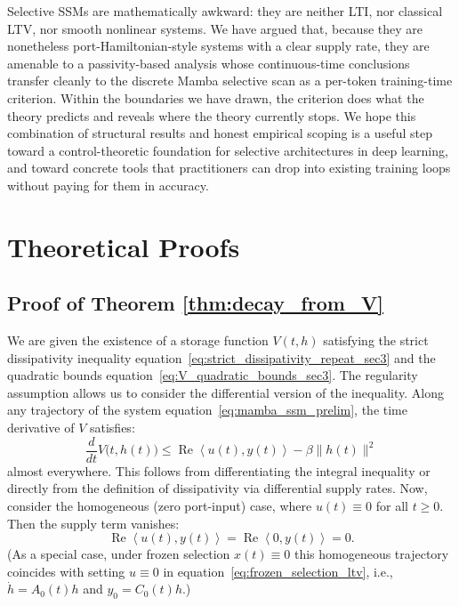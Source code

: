 \documentclass[10pt]{article} %
\def\eqref#1{equation~\ref{#1}}
\newcommand{\ip}[2]{\left\langle #1, #2 \right\rangle} %
\DeclareMathOperator{\realPart}{Re}                     %
\theoremstyle{definition}
\begin{document}
Selective SSMs are mathematically awkward: they are neither LTI, nor classical LTV, nor smooth nonlinear systems. We have argued that, because they are nonetheless port-Hamiltonian-style systems with a clear supply rate, they are amenable to a passivity-based analysis whose continuous-time conclusions transfer cleanly to the discrete Mamba selective scan as a per-token training-time criterion. Within the boundaries we have drawn, the criterion does what the theory predicts and reveals where the theory currently stops. We hope this combination of structural results and honest empirical scoping is a useful step toward a control-theoretic foundation for selective architectures in deep learning, and toward concrete tools that practitioners can drop into existing training loops without paying for them in accuracy.

\newpage




\newpage

\appendix
\section{Theoretical Proofs}
\label{appendix}

\subsection{Proof of Theorem \ref{thm:decay_from_V}}
\label{subsec:exp_decay_from_str_pass}
We are given the existence of a storage function $V(t,h)$ satisfying the strict dissipativity inequality \eqref{eq:strict_dissipativity_repeat_sec3} and the quadratic bounds \eqref{eq:V_quadratic_bounds_sec3}. The regularity assumption allows us to consider the differential version of the inequality. Along any trajectory of the system \eqref{eq:mamba_ssm_prelim}, the time derivative of $V$ satisfies:
\begin{equation} \label{eq:diff_dissipativity_sec3} %
\frac{d}{dt} V\bigl(t, h(t)\bigr) \le \realPart\ip{u(t)}{y(t)} - \beta \|h(t)\|^2
\end{equation}
almost everywhere. This follows from differentiating the integral inequality or directly from the definition of dissipativity via differential supply rates.
Now, consider the homogeneous (zero port-input) case, where $u(t)\equiv 0$ for all $t\ge 0$. Then the supply term vanishes:
\begin{equation}
\realPart\ip{u(t)}{y(t)}=\realPart\ip{0}{y(t)}=0.
\end{equation}
(As a special case, under frozen selection $x(t)\equiv 0$ this homogeneous trajectory coincides with setting $u\equiv 0$ in \eqref{eq:frozen_selection_ltv}, i.e., $\dot{h}=A_0(t)h$ and $y_0=C_0(t)h$.)
\end{document}
